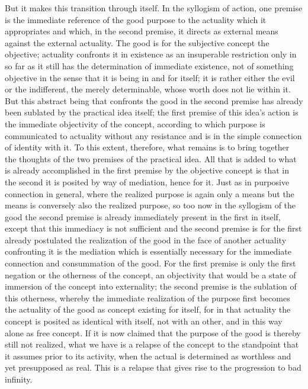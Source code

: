 But it makes this transition through itself.
In the syllogism of action,
one premise is the immediate reference of
the good purpose to the actuality which it appropriates
and which, in the second premise, it directs as
external means against the external actuality.
The good is for the subjective concept the objective;
actuality confronts it in existence
as an insuperable restriction
only in so far as it still has
the determination of immediate existence,
not of something objective in the sense
that it is being in and for itself;
it is rather either the evil or the indifferent,
the merely determinable,
whose worth does not lie within it.
But this abstract being that confronts the good
in the second premise has already been sublated
by the practical idea itself;
the first premise of this idea's action is
the immediate objectivity of the concept,
according to which purpose is communicated to
actuality without any resistance
and is in the simple connection of identity with it.
To this extent, therefore, what remains is to bring together
the thoughts of the two premises of the practical idea.
All that is added to what is already accomplished
in the first premise by the objective concept is
that in the second it is posited by way of mediation, hence for it.
Just as in purposive connection in general,
where the realized purpose is again only a means
but the means is conversely also the realized purpose,
so too now in the syllogism of the good
the second premise is already
immediately present in the first in itself,
except that this immediacy is not sufficient
and the second premise is for the first already postulated
the realization of the good in
the face of another actuality confronting it is
the mediation which is essentially necessary
for the immediate connection and consummation of the good.
For the first premise is only the first negation
or the otherness of the concept,
an objectivity that would be a state of immersion of
the concept into externality;
the second premise is the sublation of this otherness,
whereby the immediate realization of the purpose
first becomes the actuality of the good as
concept existing for itself,
for in that actuality the concept is
posited as identical with itself,
not with an other,
and in this way alone as free concept.
If it is now claimed that the purpose of the good is
thereby still not realized,
what we have is a relapse of the concept to
the standpoint that it assumes prior to its activity,
when the actual is determined as worthless
and yet presupposed as real.
This is a relapse that gives rise to
the progression to bad infinity.
